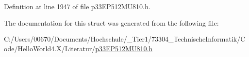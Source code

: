 Definition at line 1947 of file p33\+E\+P512\+M\+U810.\+h.



The documentation for this struct was generated from the following file\+:\begin{DoxyCompactItemize}
\item 
C\+:/\+Users/00670/\+Documents/\+Hochschule/\+\_\+\+Tier1/73304\+\_\+\+Technische\+Informatik/\+Code/\+Hello\+World4.\+X/\+Literatur/\hyperlink{p33_e_p512_m_u810_8h}{p33\+E\+P512\+M\+U810.\+h}\end{DoxyCompactItemize}
